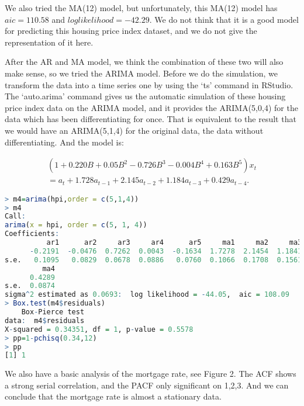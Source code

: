 \documentclass[12pt,letterpaper]{article}
\begin{document}

We also tried the MA(12) model, but unfortunately, this MA(12) model has $aic = 110.58$ and $log likelihood = -42.29$. 
We do not think that it is a good model for predicting this housing price index dataset, and we do not give the representation of it here.

After the AR and MA model, we think the combination of these two will also make sense, so we tried the ARIMA model.
Before we do the simulation, we transform the data into a time series one by using the `ts' command in RStudio.
The `auto.arima' command gives us the automatic simulation of these housing price index data on the ARIMA model, and it provides the ARIMA(5,0,4) for the data which has been differentiating for once.
That is equivalent to the result that we would have an ARIMA(5,1,4) for the original data, the data without differentiating.
And the model is: 

\begin{equation}
\begin{aligned}
(1+0.220B+0.05B^2-0.726B^3-0.004B^4+0.163B^5)x_t \\
= a_t +1.728a_{t-1}+2.145a_{t-2}+1.184a_{t-3}+0.429a_{t-4}.
\end{aligned}
\end{equation}

{\footnotesize
\begin{lstlisting}[language=R]
> m4=arima(hpi,order = c(5,1,4))
> m4
Call: 
arima(x = hpi, order = c(5, 1, 4))
Coefficients:
          ar1      ar2     ar3     ar4      ar5     ma1     ma2     ma3
      -0.2191  -0.0476  0.7262  0.0043  -0.1634  1.7278  2.1454  1.1841
s.e.   0.1095   0.0829  0.0678  0.0886   0.0760  0.1066  0.1708  0.1561
         ma4
      0.4289
s.e.  0.0874
sigma^2 estimated as 0.0693:  log likelihood = -44.05,  aic = 108.09
> Box.test(m4$residuals)
	Box-Pierce test
data:  m4$residuals  
X-squared = 0.34351, df = 1, p-value = 0.5578
> pp=1-pchisq(0.34,12)
> pp
[1] 1 
\end{lstlisting}
}

We also have a basic analysis of the mortgage rate, see Figure 2. 
The ACF shows a strong serial correlation, and the PACF only significant on 1,2,3.
And we can conclude that the mortgage rate is almost a stationary data.
\end{document}
